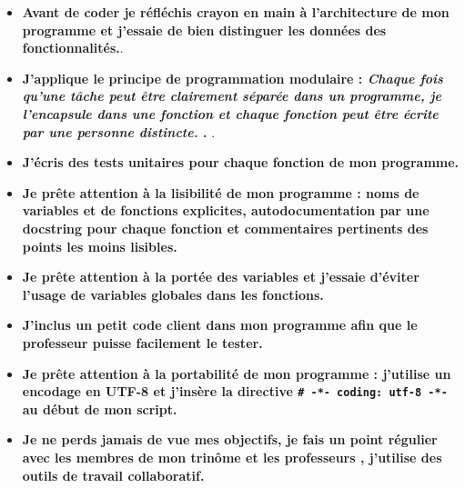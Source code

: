 \documentclass[a4paper, french, 12pt]{article}  %
\begin{document}
\begin{itemize}


\item {}  \textbf{Avant de coder je réfléchis crayon en main à l'architecture de mon programme et j'essaie de bien distinguer les données des fonctionnalités.}.

\medskip

\item {}  \textbf{J'applique le principe de programmation modulaire :\og{} \textit{Chaque fois qu'une tâche peut être clairement séparée dans un programme, je l'encapsule dans une fonction et chaque fonction peut être écrite par une personne distincte.} \fg{}.  }.

\medskip

\item {}  \textbf{J'écris  des tests unitaires pour chaque fonction de mon programme.}

\medskip

\item {}  \textbf{Je prête attention à la lisibilité de mon programme : noms de variables et de fonctions explicites, autodocumentation par une  docstring pour chaque fonction et commentaires pertinents des points les moins lisibles.}

\medskip

\item {}  \textbf{Je prête attention à la portée des variables et j'essaie d'éviter l'usage de variables globales dans les fonctions.}

\medskip


\item {} \textbf{J'inclus un petit code client dans mon programme afin que le professeur puisse facilement le tester.}


\medskip


\item {}  \textbf{Je prête attention à la portabilité de mon programme : j'utilise un encodage en UTF-8 et j'insère la directive \texttt{\# -*- coding: utf-8 -*-} au début de mon script.} 

\medskip

\item {}  \textbf{Je ne perds jamais de vue mes objectifs, je fais un point régulier avec les membres de mon trinôme et les professeurs , j'utilise des outils de travail collaboratif. }



\end{itemize}
\end{document}
